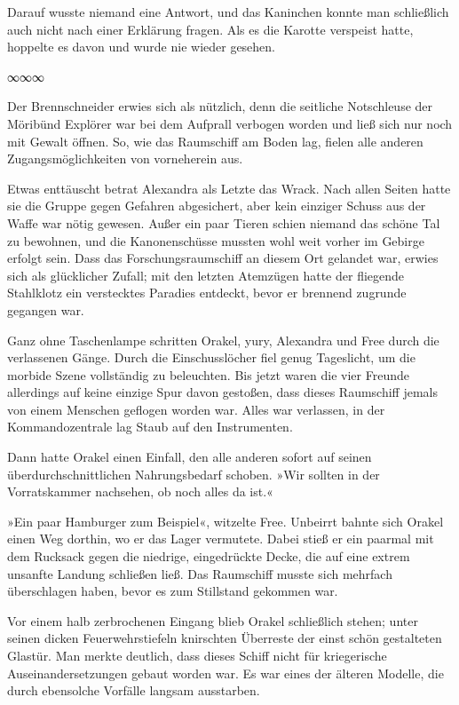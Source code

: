 Darauf wusste niemand eine Antwort, und das Kaninchen konnte man schließlich auch nicht nach einer Erklärung fragen. Als es die Karotte verspeist hatte, hoppelte es davon und wurde nie wieder gesehen.

\begin{center}
    ∞∞∞
\end{center}

Der Brennschneider erwies sich als nützlich, denn die seitliche Notschleuse der Möribünd Explörer war bei dem Aufprall verbogen worden und ließ sich nur noch mit Gewalt öffnen. So, wie das Raumschiff am Boden lag, fielen alle anderen Zugangsmöglichkeiten von vorneherein aus.

Etwas enttäuscht betrat Alexandra als Letzte das Wrack. Nach allen Seiten hatte sie die Gruppe gegen Gefahren abgesichert, aber kein einziger Schuss aus der Waffe war nötig gewesen. Außer ein paar Tieren schien niemand das schöne Tal zu bewohnen, und die Kanonenschüsse mussten wohl weit vorher im Gebirge erfolgt sein. Dass das Forschungsraumschiff an diesem Ort gelandet war, erwies sich als glücklicher Zufall; mit den letzten Atemzügen hatte der fliegende Stahlklotz ein verstecktes Paradies entdeckt, bevor er brennend zugrunde gegangen war.

Ganz ohne Taschenlampe schritten Orakel, yury, Alexandra und Free durch die verlassenen Gänge. Durch die Einschusslöcher fiel genug Tageslicht, um die morbide Szene vollständig zu beleuchten. Bis jetzt waren die vier Freunde allerdings auf keine einzige Spur davon gestoßen, dass dieses Raumschiff jemals von einem Menschen geflogen worden war. Alles war verlassen, in der Kommandozentrale lag Staub auf den Instrumenten.

Dann hatte Orakel einen Einfall, den alle anderen sofort auf seinen überdurchschnittlichen Nahrungsbedarf schoben. »Wir sollten in der Vorratskammer nachsehen, ob noch alles da ist.«

»Ein paar Hamburger zum Beispiel«, witzelte Free. Unbeirrt bahnte sich Orakel einen Weg dorthin, wo er das Lager vermutete. Dabei stieß er ein paarmal mit dem Rucksack gegen die niedrige, eingedrückte Decke, die auf eine extrem unsanfte Landung schließen ließ. Das Raumschiff musste sich mehrfach überschlagen haben, bevor es zum Stillstand gekommen war.

Vor einem halb zerbrochenen Eingang blieb Orakel schließlich stehen; unter seinen dicken Feuerwehrstiefeln knirschten Überreste der einst schön gestalteten Glastür. Man merkte deutlich, dass dieses Schiff nicht für kriegerische Auseinandersetzungen gebaut worden war. Es war eines der älteren Modelle, die durch ebensolche Vorfälle langsam ausstarben.


